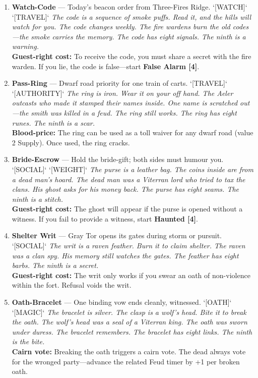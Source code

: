 \begin{enumerate}
\item \textbf{Watch-Code} --- Today's beacon order from Three-Fires Ridge. `[WATCH]` `[TRAVEL]`
  \hfill \textit{The code is a sequence of smoke puffs. Read it, and the hills will watch for you. The code changes weekly. The fire wardens burn the old codes---the smoke carries the memory. The code has eight signals. The ninth is a warning.} \\
  \textbf{Guest-right cost:} To receive the code, you must share a secret with the fire warden. If you lie, the code is false---start \textbf{False Alarm [4]}.

\item \textbf{Pass-Ring} --- Dwarf road priority for one train of carts. `[TRAVEL]` `[AUTHORITY]`
  \hfill \textit{The ring is iron. Wear it on your off hand. The Aeler outcasts who made it stamped their names inside. One name is scratched out---the smith was killed in a feud. The ring still works. The ring has eight runes. The ninth is a scar.} \\
  \textbf{Blood-price:} The ring can be used as a toll waiver for any dwarf road (value 2 Supply). Once used, the ring cracks.

\item \textbf{Bride-Escrow} --- Hold the bride-gift; both sides must humour you. `[SOCIAL]` `[WEIGHT]`
  \hfill \textit{The purse is a leather bag. The coins inside are from a dead man's hoard. The dead man was a Viterran lord who tried to tax the clans. His ghost asks for his money back. The purse has eight seams. The ninth is a stitch.} \\
  \textbf{Guest-right cost:} The ghost will appear if the purse is opened without a witness. If you fail to provide a witness, start \textbf{Haunted [4]}.

\item \textbf{Shelter Writ} --- Gray Tor opens its gates during storm or pursuit. `[SOCIAL]`
  \hfill \textit{The writ is a raven feather. Burn it to claim shelter. The raven was a clan spy. His memory still watches the gates. The feather has eight barbs. The ninth is a secret.} \\
  \textbf{Guest-right cost:} The writ only works if you swear an oath of non-violence within the fort. Refusal voids the writ.

\item[J] \textbf{Oath-Bracelet} --- One binding vow ends cleanly, witnessed. `[OATH]` `[MAGIC]`
  \hfill \textit{The bracelet is silver. The clasp is a wolf's head. Bite it to break the oath. The wolf's head was a seal of a Viterran king. The oath was sworn under duress. The bracelet remembers. The bracelet has eight links. The ninth is the bite.} \\
  \textbf{Cairn vote:} Breaking the oath triggers a cairn vote. The dead always vote for the wronged party---advance the related Feud timer by +1 per broken oath.


\end{enumerate}
